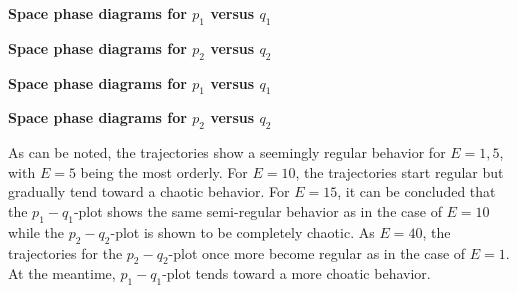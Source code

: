 \documentclass[12pt]{article}
\begin{document}
\begin{figure*}[ht!]
\begin{center}
   \textbf{Space phase diagrams for $p_1$ versus $q_1$}
   \subfloat[\label{genworkflow}]{%
      \texttt{[image: p1\_E=1.jpg]}}
   \subfloat[\label{pyramidprocess} ]{%
      \texttt{[image: p1\_E=5.jpg]}}
   \subfloat[\label{mt-simtask}]{%
      \texttt{[image: p1\_E=10.jpg]}}\\
   \caption{\label{workflow} 
   (a) $E = 1$; 
   (b) $E = 5$; 
   (c) $E = 10$}
\end{center}
\end{figure*}
\begin{figure*}[ht!]
\begin{center}
   \textbf{Space phase diagrams for $p_2$ versus $q_2$}
   \subfloat[\label{genworkflow}]{%
      \texttt{[image: p2\_E=1.jpg]}}
   \subfloat[\label{pyramidprocess} ]{%
      \texttt{[image: p2\_E=5.jpg]}}
   \subfloat[\label{mt-simtask}]{%
      \texttt{[image: p2\_E=10.jpg]}}\\
   \caption{\label{workflow} 
   (a) $E = 1$; 
   (b) $E = 5$; 
   (c) $E = 10$}
\end{center}
\end{figure*}
\newpage 

\begin{figure*}[ht!]
\begin{center}
   \textbf{Space phase diagrams for $p_1$ versus $q_1$}
   \subfloat[\label{genworkflow}]{%
      \texttt{[image: p1\_E=15.jpg]}}
   \subfloat[\label{pyramidprocess} ]{%
      \texttt{[image: p1\_E=40.jpg]}}\\
   \caption{\label{workflow} 
   (a) $E = 15$; 
   (b) $E = 40$;}
\end{center}
\end{figure*}

\begin{figure*}[ht!]
\begin{center}
   \textbf{Space phase diagrams for $p_2$ versus $q_2$}
   \subfloat[\label{genworkflow}]{%
      \texttt{[image: p2\_E=15.jpg]}}
   \subfloat[\label{pyramidprocess} ]{%
      \texttt{[image: p2\_E=40.jpg]}}\\
   \caption{\label{workflow} 
   (a) $E = 15$; 
   (b) $E = 40$;}
\end{center}
\end{figure*}

\noindent As can be noted, the trajectories show a seemingly regular behavior for $E = 1, 5$, with $E = 5$ being the most orderly. For $E = 10$, the trajectories start regular but gradually tend toward a chaotic behavior.
For $E = 15$, it can be concluded that the $p_1-q_1$-plot shows the same semi-regular behavior as in the case of $E = 10$ while the $p_2-q_2$-plot is shown to be completely chaotic. As $E = 40$, the trajectories for the $p_2-q_2$-plot once more become regular as in the case of $E = 1$. At the meantime, $p_1-q_1$-plot tends toward a more choatic behavior.
\end{document}
